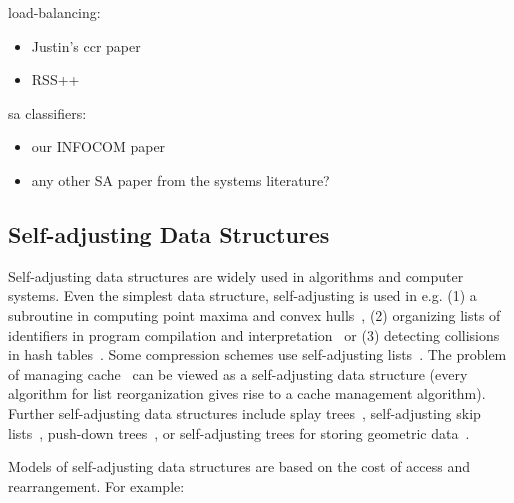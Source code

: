 load-balancing:
\begin{itemize}
\item Justin's ccr paper
\item RSS++
\end{itemize}

sa classifiers:
\begin{itemize}
\item our INFOCOM paper
\item any other SA paper from the systems literature?
\end{itemize}

\subsection{Self-adjusting Data Structures}

Self-adjusting data structures are widely used in algorithms and computer systems.
Even the simplest data structure, self-adjusting is used in e.g. (1) a subroutine in computing point maxima and convex hulls~\cite{BentleyCL93}, (2) organizing lists of identifiers in program compilation and interpretation~\cite{HesterH85} or (3) detecting collisions in hash tables~\cite{HesterH85}.
Some compression schemes use self-adjusting lists~\cite{BentleySTW86}.
The problem of managing cache~\cite{SleatorT85} can be viewed as a self-adjusting data structure (every algorithm for list reorganization gives rise to a cache management algorithm).
Further self-adjusting data structures include splay trees~\cite{SleatorT85Splay}, self-adjusting skip lists~\cite{BoseDL08}, push-down trees~\cite{Avin0020}, or self-adjusting trees for storing geometric data~\cite{ParkM12}.


Models of self-adjusting data structures are based on the cost of access and rearrangement. For example:

